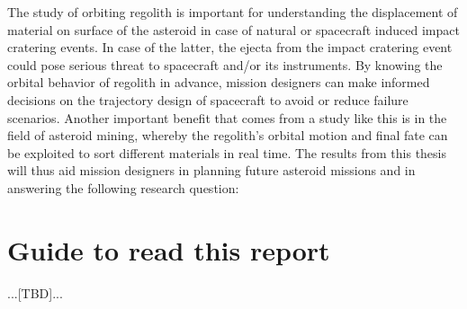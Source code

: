 %
\newline\newline
%
The study of orbiting regolith is important for understanding the displacement of material on surface of the asteroid in case of natural or spacecraft induced impact cratering events. In case of the latter, the ejecta from the impact cratering event could pose serious threat to spacecraft and/or its instruments. By knowing the orbital behavior of regolith in advance, mission designers can make informed decisions on the trajectory design of spacecraft to avoid or reduce failure scenarios. Another important benefit that comes from a study like this is in the field of asteroid mining, whereby the regolith's orbital motion and final fate can be exploited to sort different materials in real time. The results from this thesis will thus aid mission designers in planning future asteroid missions and in answering the following research question:
\vspace{5mm}
\begin{center}
\end{center}
\vspace{5mm}
\section{Guide to read this report}
\label{sec:report_reading_guide}
...[TBD]...

